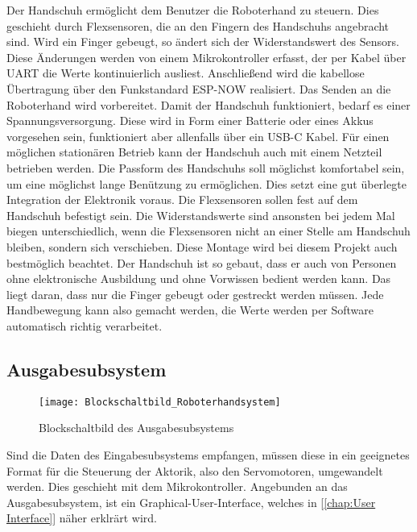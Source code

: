 \documentclass[titlepage,12pt,twoside]{article}
\begin{document}
Der Handschuh ermöglicht dem Benutzer die Roboterhand zu steuern. Dies geschieht 
durch Flexsensoren, die an den Fingern des Handschuhs angebracht sind. Wird ein 
Finger gebeugt, so ändert sich der Widerstandswert des Sensors. Diese Änderungen 
werden von einem Mikrokontroller erfasst, der per Kabel über UART die Werte 
kontinuierlich ausliest. Anschließend wird die kabellose Übertragung über den 
Funkstandard ESP-NOW realisiert. Das Senden an die Roboterhand wird vorbereitet. 
Damit der Handschuh funktioniert, bedarf es einer Spannungsversorgung. Diese wird 
in Form einer Batterie oder eines Akkus vorgesehen sein, funktioniert aber allenfalls 
über ein USB-C Kabel. Für einen möglichen stationären Betrieb kann der Handschuh 
auch mit einem Netzteil betrieben werden. Die Passform des Handschuhs soll 
möglichst komfortabel sein, um eine möglichst lange Benützung zu ermöglichen. 
Dies setzt eine gut überlegte Integration der Elektronik voraus. Die Flexsensoren 
sollen fest auf dem Handschuh befestigt sein. Die Widerstandswerte sind ansonsten 
bei jedem Mal biegen unterschiedlich, wenn die Flexsensoren nicht an einer Stelle 
am Handschuh bleiben, sondern sich verschieben. Diese Montage wird bei diesem 
Projekt auch bestmöglich beachtet. Der Handschuh ist so gebaut, dass er auch von 
Personen ohne elektronische Ausbildung und ohne Vorwissen bedient werden kann. 
Das liegt daran, dass nur die Finger gebeugt oder gestreckt werden müssen. Jede 
Handbewegung kann also gemacht werden, die Werte werden per Software automatisch 
richtig verarbeitet. \\

\subsection{Ausgabesubsystem}
\label{chap:Ausgabesubsystem}

\begin{figure}[H]
	\begin{center}
		\scalebox{0.8}
		{\texttt{[image: Blockschaltbild\_Roboterhandsystem]}}
		\caption{Blockschaltbild des Ausgabesubsystems}
		\label{fig:Blockschaltbild_Roboterhandsystem}		
	\end{center}
\end{figure}

Sind die Daten des Eingabesubsystems empfangen, müssen diese in ein geeignetes Format für die Steuerung der Aktorik, also den Servomotoren,
umgewandelt werden. Dies geschieht mit dem Mikrokontroller. Angebunden an das Ausgabesubsystem, ist ein Graphical-User-Interface, 
welches in [\textcolor{blue}{\autoref{chap:User Interface}}] näher erklrärt wird. \\
\end{document}
